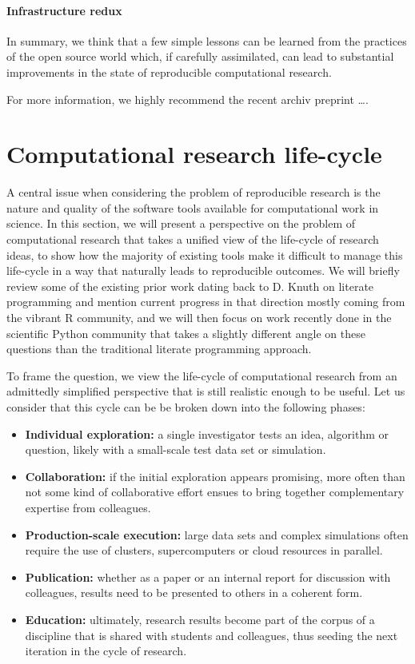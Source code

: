 \documentclass[ChapterTOCs,krantz2]{krantz} %
\begin{document}
\paragraph{ {\bf Infrastructure redux}}


In summary, we think that a few simple lessons can be learned from
the practices of the open source world which, if carefully assimilated,
can lead to substantial improvements in the state of reproducible
computational research. 

For more information, we highly recommend the recent archiv preprint
\ldots \cite{2012arXiv1210.0530A}.

\section{\label{sec:life-cycle}Computational research life-cycle}

A central issue when considering the problem of reproducible research is the
nature and quality of the software tools available for computational work in
science.  In this section, we will present a perspective on the problem of
computational research that takes a unified view of the life-cycle of research
ideas, to show how the majority of existing tools make it difficult to manage
this life-cycle in a way that naturally leads to reproducible outcomes.  We
will briefly review some of the existing prior work dating back to D. Knuth on
literate programming \cite{Knuth92} and mention current progress in that
direction mostly coming from the vibrant R community, and we will then focus on
work recently done in the scientific Python community that takes a slightly
different angle on these questions than the traditional literate programming
approach.

To frame the question, we view the life-cycle of computational research from an
admittedly simplified perspective that is still realistic enough to be
useful. Let us consider that this cycle can be be broken down into the
following phases:

\begin{itemize}
\item \textbf{Individual exploration:} a single investigator tests an idea,
  algorithm or question, likely with a small-scale test data set or simulation.
\item \textbf{Collaboration:} if the initial exploration appears promising,
  more often than not some kind of collaborative effort ensues to bring
  together complementary expertise from colleagues.
\item \textbf{Production-scale execution:} large data sets and complex
  simulations often require the use of clusters, supercomputers or cloud
  resources in parallel.
\item \textbf{Publication:} whether as a paper or an internal report for
  discussion with colleagues, results need to be presented to others in a
  coherent form.
\item \textbf{Education:} ultimately, research results become part of the
  corpus of a discipline that is shared with students and colleagues, thus
  seeding the next iteration in the cycle of research.
\end{itemize}
\end{document}
